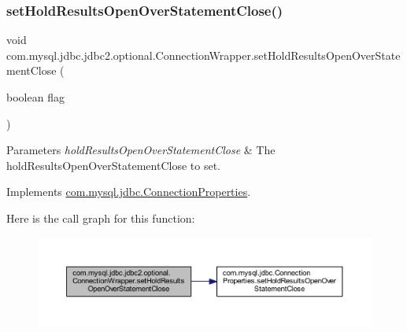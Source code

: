 \subsubsection{\texorpdfstring{set\+Hold\+Results\+Open\+Over\+Statement\+Close()}{setHoldResultsOpenOverStatementClose()}}
{\footnotesize\ttfamily void com.\+mysql.\+jdbc.\+jdbc2.\+optional.\+Connection\+Wrapper.\+set\+Hold\+Results\+Open\+Over\+Statement\+Close (\begin{DoxyParamCaption}\item[{boolean}]{flag }\end{DoxyParamCaption})}


\begin{DoxyParams}{Parameters}
{\em hold\+Results\+Open\+Over\+Statement\+Close} & The hold\+Results\+Open\+Over\+Statement\+Close to set. \\
\hline
\end{DoxyParams}


Implements \mbox{\hyperlink{interfacecom_1_1mysql_1_1jdbc_1_1_connection_properties_a9447a03edd2efdd020960e0a12d22aa7}{com.\+mysql.\+jdbc.\+Connection\+Properties}}.

Here is the call graph for this function\+:
\nopagebreak
\begin{figure}[H]
\begin{center}
\leavevmode
\includegraphics[width=350pt]{classcom_1_1mysql_1_1jdbc_1_1jdbc2_1_1optional_1_1_connection_wrapper_a0b8d475aec95896806332ff84d251468_cgraph}
\end{center}
\end{figure}
\mbox{\label{classcom_1_1mysql_1_1jdbc_1_1jdbc2_1_1optional_1_1_connection_wrapper_a67f86e88b0cdc508024a59978cc255af}} 
